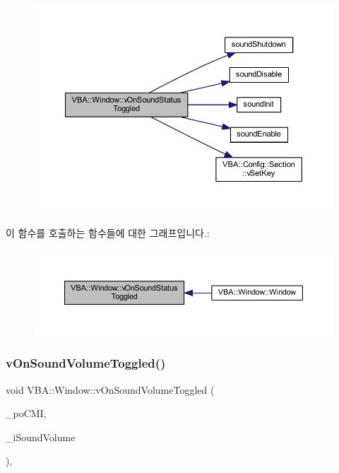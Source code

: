 \begin{figure}[H]
\begin{center}
\leavevmode
\includegraphics[width=350pt]{class_v_b_a_1_1_window_af883be4dc5fbd611a2b5610aa26cfff7_cgraph}
\end{center}
\end{figure}
이 함수를 호출하는 함수들에 대한 그래프입니다.\+:
\nopagebreak
\begin{figure}[H]
\begin{center}
\leavevmode
\includegraphics[width=350pt]{class_v_b_a_1_1_window_af883be4dc5fbd611a2b5610aa26cfff7_icgraph}
\end{center}
\end{figure}
\mbox{\label{class_v_b_a_1_1_window_a6e1456ec5b5efc3a5e24d91ed918d503}} 
\subsubsection{\texorpdfstring{v\+On\+Sound\+Volume\+Toggled()}{vOnSoundVolumeToggled()}}
{\footnotesize\ttfamily void V\+B\+A\+::\+Window\+::v\+On\+Sound\+Volume\+Toggled (\begin{DoxyParamCaption}\item[{Gtk\+::\+Check\+Menu\+Item $\ast$}]{\+\_\+po\+C\+MI,  }\item[{\mbox{\hyperlink{_util_8cpp_a0ef32aa8672df19503a49fab2d0c8071}{int}}}]{\+\_\+i\+Sound\+Volume }\end{DoxyParamCaption})\hspace{0.3cm}{\ttfamily [protected]}, {\ttfamily [virtual]}}



